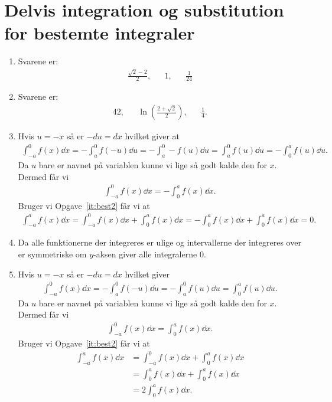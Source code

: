 \section{Delvis integration og substitution for bestemte integraler}
\begin{enumerate}
	\item Svarene er:
	\begin{align*}
	\frac{\sqrt{2}-2}{2},&& 1,&& \frac{1}{24}
	\end{align*}
	
	
	
	\item Svarene er:
	\begin{align*}
	42,&& \ln(\frac{2+\sqrt{2}}{2}),&&\frac{1}{4}.
	\end{align*}
	
	\item\label{it:bes11ans} Hvis $u=-x$ så er $-du=dx$ hvilket giver at
	\begin{align*}
	\int_{-a}^{0}f(x) \dd x=-\int_{a}^{0} f(-u)\dd u=-\int_a^0-f(u) \dd u=\int_{a}^{0}f(u)\dd u=-\int_0^af(u)\dd u.
	\end{align*}
	Da $u$ bare er navnet på variablen kunne vi lige så godt kalde den for $x$. Dermed får vi
	\begin{align*}
	\int_{-a}^{0}f(x)\dd x=-\int_{0}^{a}f(x)\dd x.
	\end{align*}
	Bruger vi Opgave~\ref{it:best2} får vi at
	\begin{align*}
	\int_{-a}^{a}f(x)\dd x=\int_{-a}^{0}f(x)\dd x+\int_{0}^{a} f(x)\dd x=-\int_{0}^{a} f(x)\dd x+\int_{0}^{a} f(x)\dd x=0.
	\end{align*}
	
	\item Da alle funktionerne der integreres er ulige og intervallerne der integreres over er symmetriske om $y$-aksen giver alle integralerne $0$.
	
	\item Hvis $u=-x$ så er $-du=dx$ hvilket giver
	\begin{align*}
	\int_{-a}^{0}f(x)\dd x=-\int_{a}^{0} f(-u)\dd u=-\int_{a}^{0}f(u)\dd u=\int_0^a f(u)\dd u.
	\end{align*}
	Da $u$ bare er navnet på variablen kunne vi lige så godt kalde den for $x$. Dermed får vi
	\begin{align*}
	\int_{-a}^{0}f(x)\dd x=\int_{0}^{a}f(x)\dd x.
	\end{align*}
	Bruger vi Opgave~\ref{it:best2} får vi at
	\begin{align*}
	\int_{-a}^{a}f(x)\dd x&=\int_{-a}^{0}f(x)\dd x+\int_{0}^{a} f(x)\dd x\\&=\int_{0}^{a} f(x)\dd x+\int_{0}^{a} f(x)\dd x\\&=2\int_{0}^{a} f(x)\dd x.
	\end{align*}


\end{enumerate}
